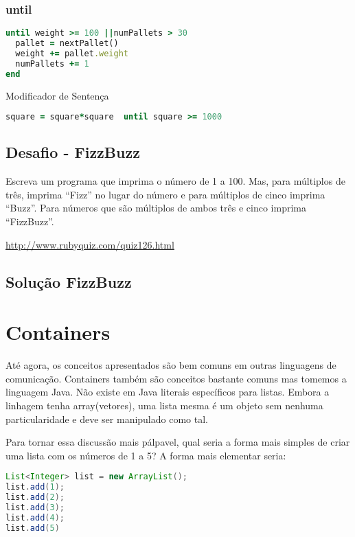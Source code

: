 \documentclass[serif,mathserif]{book}
\begin{document}
\subsection{until} 
\begin{lstlisting}[language=ruby]
until weight >= 100 ||numPallets > 30
  pallet = nextPallet()
  weight += pallet.weight
  numPallets += 1
end
\end{lstlisting}

Modificador de Sentença

\begin{lstlisting}[language=ruby]
square = square*square  until square >= 1000
\end{lstlisting}

\section{Desafio - FizzBuzz}  
Escreva um programa que imprima o número de 1 a 100.
Mas, para múltiplos de três, imprima  ``Fizz'' no lugar do
número e para múltiplos de cinco imprima ``Buzz''. Para
números que são múltiplos de ambos três e cinco
imprima ``FizzBuzz''.
 
\url{http://www.rubyquiz.com/quiz126.html}

\section{Solução FizzBuzz}



\chapter{Containers}

Até agora, os conceitos apresentados são bem comuns em outras linguagens de comunicação. Containers também são
conceitos bastante comuns mas tomemos a linguagem Java. Não existe em Java literais específicos para 
listas. Embora a linhagem tenha array(vetores), uma lista mesma é um objeto sem nenhuma particularidade e
deve ser manipulado como tal.

Para tornar essa discussão mais pálpavel, qual seria a forma mais simples de criar uma lista com os números de 
1 a 5? A forma mais elementar seria:
\begin{lstlisting}[language=Java]
List<Integer> list = new ArrayList();
list.add(1);
list.add(2);
list.add(3);
list.add(4);
list.add(5)
\end{lstlisting}
\end{document}

